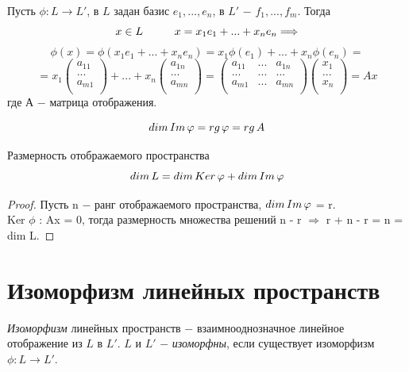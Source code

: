 Пусть $\phi : L \longrightarrow L'$, в $L$ задан базис $e_1, ..., e_n$, в $L'$ $-$ $f_1, ..., f_m$. Тогда
\[
x \in L \tab x = x_1e_1 + ... + x_ne_n \Longrightarrow
\]
\[
\phi(x) = \phi(x_1e_1 + ... + x_ne_n) = x_1\phi(e_1) + ... + x_n\phi(e_n) =
\]
\[
= x_1\begin{pmatrix}
    a_{11}\\
    ...\\
    a_{m1}\\
\end{pmatrix} + ... + x_n\begin{pmatrix}
    a_{1n}\\
    ...\\
    a_{mn}\\
\end{pmatrix} = \begin{pmatrix}
    a_{11} & ... & a_{1n}\\
    ... & ... & ...\\
    a_{m1} & ... & a_{mn}\\
\end{pmatrix}\begin{pmatrix}
    x_1\\
    ...\\
    x_n\\
\end{pmatrix} = Ax
\]
где А $-$ матрица отображения.

\begin{proposition}
    \[
    dim\thinspace Im\thinspace\phi = rg\thinspace\phi = rg\thinspace A
    \]
\end{proposition}

\begin{theorem}
    Размерность отображаемого пространства
    \[
    dim\thinspace L = dim\thinspace Ker\thinspace\phi + dim\thinspace Im\thinspace\phi
    \]
\end{theorem}
\begin{proof}
    Пусть n $-$ ранг отображаемого пространства, $dim\thinspace Im\thinspace\phi$ = r.\\
    Ker $\phi$ : Ax = 0, тогда размерность множества решений n - r $\Longrightarrow$ r + n - r = n = dim L.
\end{proof}







\section{Изоморфизм линейных пространств}
\begin{definition}
    \textit{Изоморфизм} линейных пространств $-$ взаимнооднозначное линейное отображение из $L$ в $L'$. $L$ и $L'$ $-$ \textit{изоморфны}, если существует изоморфизм $\phi : L \longrightarrow L'$.
\end{definition}

